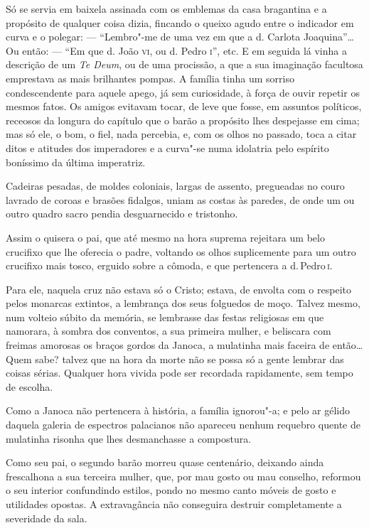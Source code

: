 Só se servia em baixela assinada com os emblemas da casa bragantina e a
propósito de qualquer coisa dizia, fincando o queixo agudo entre o
indicador em curva e o polegar: --- ``Lembro"-me de uma vez em que a d.
Carlota Joaquina''\ldots{} Ou então: --- ``Em que d. João \textsc{vi}, ou d. Pedro \textsc{i}'',
etc. E em seguida lá vinha a descrição de um \emph{Te Deum}, ou de uma
procissão, a que a sua imaginação facultosa emprestava as mais
brilhantes pompas. A família tinha um sorriso condescendente para aquele
apego, já sem curiosidade, à força de ouvir repetir os mesmos fatos. Os
amigos evitavam tocar, de leve que fosse, em assuntos políticos,
receosos da longura do capítulo que o barão a propósito lhes despejasse
em cima; mas só ele, o bom, o fiel, nada percebia, e, com os olhos no
passado, toca a citar ditos e atitudes dos imperadores e a curva"-se
numa idolatria pelo espírito boníssimo da última imperatriz.

Cadeiras pesadas, de moldes coloniais, largas de assento, pregueadas no
couro lavrado de coroas e brasões fidalgos, uniam as costas às paredes,
de onde um ou outro quadro sacro pendia desguarnecido e tristonho.

Assim o quisera o pai, que até mesmo na hora suprema rejeitara um belo
crucifixo que lhe oferecia o padre, voltando os olhos suplicemente para
um outro crucifixo mais tosco, erguido sobre a cômoda, e que pertencera
a d.\,Pedro\,\textsc{i}.

Para ele, naquela cruz não estava só o Cristo; estava, de envolta com o
respeito pelos monarcas extintos, a lembrança dos seus folguedos de
moço. Talvez mesmo, num volteio súbito da memória, se lembrasse das
festas religiosas em que namorara, à sombra dos conventos, a sua
primeira mulher, e beliscara com freimas amorosas os braços gordos da
Janoca, a mulatinha mais faceira de então\ldots{} Quem sabe? talvez que na
hora da morte não se possa só a gente lembrar das coisas sérias.
Qualquer hora vivida pode ser recordada rapidamente, sem tempo de
escolha.

Como a Janoca não pertencera à história, a família ignorou"-a; e pelo ar
gélido daquela galeria de espectros palacianos não apareceu nenhum
requebro quente de mulatinha risonha que lhes desmanchasse a compostura.

Como seu pai, o segundo barão morreu quase centenário, deixando ainda
frescalhona a sua terceira mulher, que, por mau gosto ou mau conselho,
reformou o seu interior confundindo estilos, pondo no mesmo canto móveis
de gosto e utilidades opostas. A extravagância não conseguira destruir
completamente a severidade da sala.

